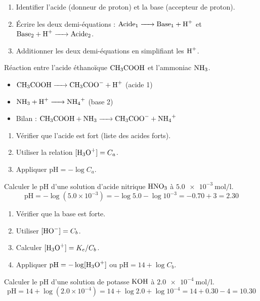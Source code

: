 \begin{enumerate}
    \item Identifier l'acide (donneur de proton) et la base (accepteur de proton).
    \item Écrire les deux demi-équations : $\ce{Acide1 -> Base1 + H+}$ et $\ce{Base2 + H+ -> Acide2}$.
    \item Additionner les deux demi-équations en simplifiant les $\ce{H+}$.
\end{enumerate}
\begin{exemple}
Réaction entre l'acide éthanoïque $\ce{CH3COOH}$ et l'ammoniac $\ce{NH3}$.
\begin{itemize}
    \item $\ce{CH3COOH -> CH3COO- + H+}$ (acide 1)
    \item $\ce{NH3 + H+ -> NH4+}$ (base 2)
    \item Bilan : $\ce{CH3COOH + NH3 -> CH3COO- + NH4+}$
\end{itemize}
\end{exemple}

\begin{enumerate}
    \item Vérifier que l'acide est fort (liste des acides forts).
    \item Utiliser la relation $[\ce{H3O+}] = C_a$.
    \item Appliquer $\text{pH} = -\log C_a$.
\end{enumerate}
\begin{exemple}
Calculer le pH d'une solution d'acide nitrique $\ce{HNO3}$ à $\SI{5.0e-3}{\mol\per\litre}$.
\[
\text{pH} = -\log(5.0 \times 10^{-3}) = -\log 5.0 - \log 10^{-3} = -0.70 + 3 = 2.30
\]
\end{exemple}

\begin{enumerate}
    \item Vérifier que la base est forte.
    \item Utiliser $[\ce{HO-}] = C_b$.
    \item Calculer $[\ce{H3O+}] = K_e / C_b$.
    \item Appliquer $\text{pH} = -\log[\ce{H3O+}]$ ou $\text{pH} = 14 + \log C_b$.
\end{enumerate}
\begin{exemple}
Calculer le pH d'une solution de potasse $\ce{KOH}$ à $\SI{2.0e-4}{\mol\per\litre}$.
\[
\text{pH} = 14 + \log(2.0 \times 10^{-4}) = 14 + \log 2.0 + \log 10^{-4} = 14 + 0.30 - 4 = 10.30
\]
\end{exemple}

